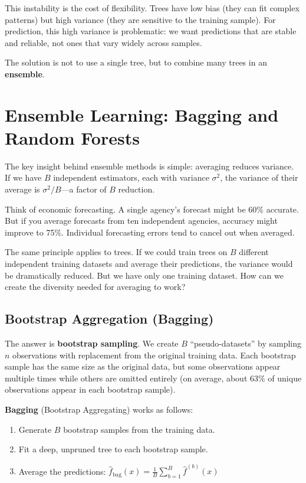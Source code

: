 \documentclass[11pt,a4paper]{article}
\newcommand{\keyword}[1]{\textbf{\textcolor{AccentOrange}{#1}}}
\begin{document}
This instability is the cost of flexibility. Trees have low bias (they can fit complex patterns) but high variance (they are sensitive to the training sample). For prediction, this high variance is problematic: we want predictions that are stable and reliable, not ones that vary widely across samples.

The solution is not to use a single tree, but to combine many trees in an \keyword{ensemble}.

\section{Ensemble Learning: Bagging and Random Forests}

The key insight behind ensemble methods is simple: averaging reduces variance. If we have $B$ independent estimators, each with variance $\sigma^2$, the variance of their average is $\sigma^2/B$---a factor of $B$ reduction.

Think of economic forecasting. A single agency's forecast might be 60\% accurate. But if you average forecasts from ten independent agencies, accuracy might improve to 75\%. Individual forecasting errors tend to cancel out when averaged.

The same principle applies to trees. If we could train trees on $B$ different independent training datasets and average their predictions, the variance would be dramatically reduced. But we have only one training dataset. How can we create the diversity needed for averaging to work?

\subsection{Bootstrap Aggregation (Bagging)}

The answer is \keyword{bootstrap sampling}. We create $B$ ``pseudo-datasets'' by sampling $n$ observations with replacement from the original training data. Each bootstrap sample has the same size as the original data, but some observations appear multiple times while others are omitted entirely (on average, about 63\% of unique observations appear in each bootstrap sample).

\textbf{Bagging} (Bootstrap Aggregating) works as follows:
\begin{enumerate}
    \item Generate $B$ bootstrap samples from the training data.
    \item Fit a deep, unpruned tree to each bootstrap sample.
    \item Average the predictions: $\widehat{f}_{\text{bag}}(x) = \frac{1}{B} \sum_{b=1}^{B} \widehat{f}^{(b)}(x)$
\end{enumerate}
\end{document}
